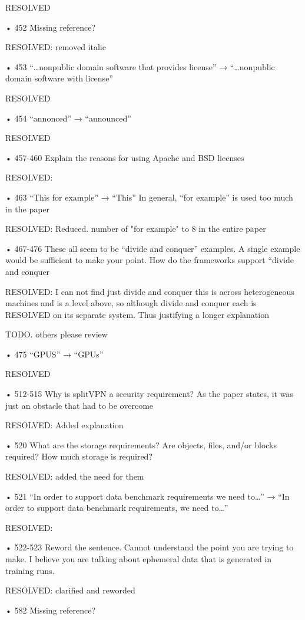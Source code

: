     RESOLVED

• 452 Missing reference?

    RESOLVED: removed italic

• 453 “…nonpublic domain software that provides license” → “…nonpublic domain
software with license”

    RESOLVED

• 454 “annonced” → “announced”

    RESOLVED
    
• 457-460 Explain the reasons for using Apache and BSD licenses

    RESOLVED:

• 463 “This for example” → “This” In general, “for example” is used too much in the
paper

    RESOLVED: Reduced. number of "for example" to 8 in the entire paper

• 467-476 These all seem to be “divide and conquer” examples. A single example would
be sufficient to make your point. How do the frameworks support “divide and conquer

    RESOLVED: I can not find just divide and conquer this is across heterogeneous machines and is a level above, so although divide and conquer each is RESOLVED on its separate system. Thus justifying a longer explanation

    TODO. others please review

• 475 “GPUS” → “GPUs”

    RESOLVED
    
• 512-515 Why is splitVPN a security requirement? As the paper states, it was just an
obstacle that had to be overcome

    RESOLVED: Added explanation
    
• 520 What are the storage requirements? Are objects, files, and/or blocks required? How
much storage is required?

   RESOLVED: added the need for them
    
• 521 “In order to support data benchmark requirements we need to…” → “In order to
support data benchmark requirements, we need to…”

    RESOLVED:
    
• 522-523 Reword the sentence. Cannot understand the point you are trying to make. I
believe you are talking about ephemeral data that is generated in training runs.

    RESOLVED: clarified and reworded
    
• 582 Missing reference?

